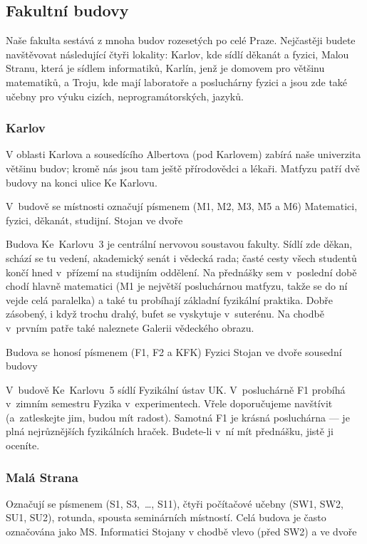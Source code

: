 \subsection{Fakultní budovy}
Naše fakulta sestává z mnoha budov rozesetých po celé Praze. Nejčastěji budete navštěvovat následující čtyři lokality:
Karlov, kde sídlí děkanát a fyzici, Malou Stranu, která je sídlem informatiků, Karlín, jenž je domovem pro většinu
matematiků, a Troju, kde mají laboratoře a posluchárny fyzici a jsou zde také učebny pro výuku cizích,
neprogramátorských, jazyků.

\subsubsection{Karlov}
V oblasti Karlova a sousedícího Albertova (pod Karlovem) zabírá naše univerzita většinu budov; kromě nás jsou tam ještě
přírodovědci a lékaři. Matfyzu patří dvě budovy na konci ulice Ke Karlovu.

{V~budově se místnosti označují písmenem  (M1, M2, M3, M5 a M6)}
{Matematici, fyzici, děkanát, studijní.}
{Stojan ve dvoře}

Budova Ke~Karlovu~3 je centrální nervovou soustavou fakulty. Sídlí zde
děkan, schází se tu vedení, akademický senát i vědecká rada; časté
cesty všech studentů končí hned v~přízemí na studijním oddělení.
Na přednášky sem v~poslední době chodí hlavně matematici
(M1 je největší posluchárnou matfyzu, takže se do ní vejde celá
paralelka) a také tu probíhají základní fyzikální praktika.
Dobře zásobený, i když trochu drahý, bufet se vyskytuje
v~suterénu. Na chodbě v~prvním patře také naleznete Galerii
vědeckého obrazu.

{Budova se honosí písmenem  (F1, F2 a KFK)}
{Fyzici}
{Stojan ve dvoře sousední budovy}

V~budově Ke~Karlovu~5 sídlí Fyzikální ústav UK. V~posluchárně F1 probíhá
v~zimním semestru  Fyzika v~experimentech.
Vřele do\-po\-ru\-ču\-je\-me navštívit (a~zatleskejte jim, budou mít
radost). Samotná F1 je krásná posluchárna --- je plná nejrůznějších
fyzikálních hraček. Budete-li v~ní mít přednášku, jistě ji oceníte.


\subsubsection{Malá Strana}

{Označují se písmenem  (S1, S3,~\dots, S11), čtyři počítačové učebny (SW1, SW2, SU1, SU2), rotunda, spousta
seminárních
místností. Celá budova je často označována jako MS.}
{Informatici}
{Stojany v chodbě vlevo (před SW2) a ve dvoře}


